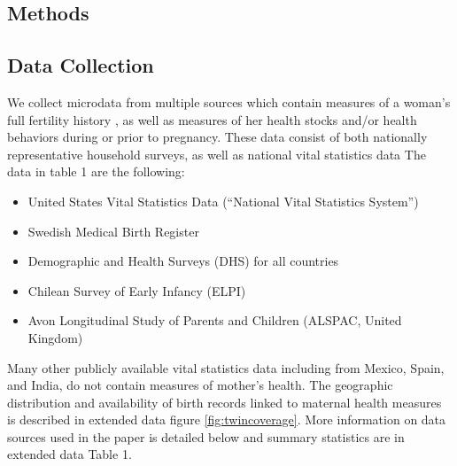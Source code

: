 \documentclass{nature}
\begin{document}
\begin{linenumbers}
\clearpage

\section{Methods}
\subsection{Data Collection}
We collect microdata from multiple sources %
which contain measures of a woman's full fertility history 
, as well as measures of her health stocks and/or health behaviors during or prior to pregnancy.  These data consist of both nationally representative household surveys, as well as national vital statistics data %
The data in table 1 are the following:
\begin{itemize}
\item United States Vital Statistics Data (``National Vital Statistics System'') \vspace{-4mm}
\item Swedish Medical Birth Register \vspace{-4mm}
\item Demographic and Health Surveys (DHS) for all countries \vspace{-4mm}
\item Chilean Survey of Early Infancy (ELPI) \vspace{-4mm}
\item Avon Longitudinal Study of Parents and Children (ALSPAC, United Kingdom)
\end{itemize}
Many other %
publicly available vital statistics data including from Mexico, Spain, and India, do not contain  measures of mother's health.  The geographic distribution and availability of birth records linked to maternal health measures is described in extended data figure \ref{fig:twincoverage}.  %
More information on data sources used in the paper is detailed below and summary statistics are in extended data Table 1. 


\end{linenumbers}
\end{document}
